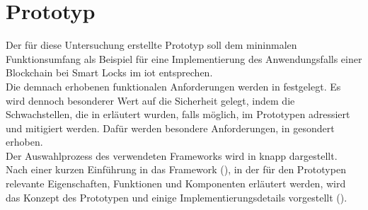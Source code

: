 \section{Prototyp}
\label{sec:prototype}
    Der für diese Untersuchung erstellte Prototyp soll dem mininmalen Funktionsumfang als Beispiel für eine Implementierung des Anwendungsfalls einer Blockchain bei Smart Locks im \gls{iot} entsprechen.\\
    Die demnach erhobenen funktionalen Anforderungen werden in  festgelegt. 
    Es wird dennoch besonderer Wert auf die Sicherheit gelegt, indem die Schwachstellen, die in  erläutert wurden, falls möglich, im Prototypen adressiert und mitigiert werden. 
    Dafür werden besondere Anforderungen, in  gesondert erhoben.\\
    Der Auswahlprozess des verwendeten Frameworks wird in  knapp dargestellt. 
    Nach einer kurzen Einführung in das Framework (), in der für den Prototypen relevante Eigenschaften, Funktionen und Komponenten erläutert werden, wird das Konzept des Prototypen und einige Implementierungsdetails vorgestellt (). 
